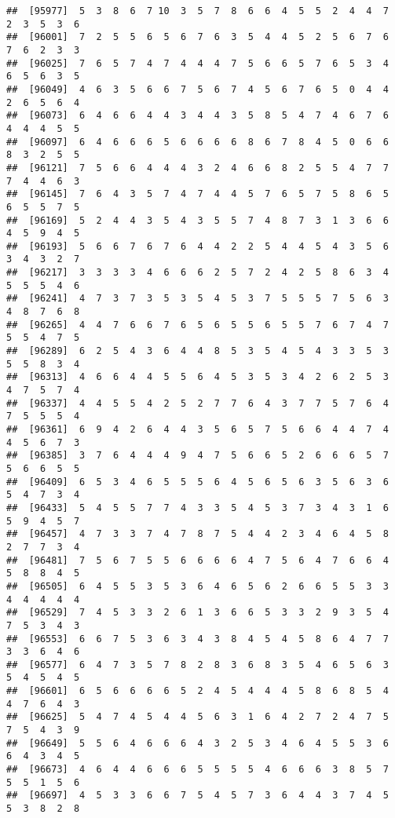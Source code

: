 \documentclass[
]{book}
\begin{document}
\begin{verbatim}
##  [95977]  5  3  8  6  7 10  3  5  7  8  6  6  4  5  5  2  4  4  7  2  3  5  3  6
##  [96001]  7  2  5  5  6  5  6  7  6  3  5  4  4  5  2  5  6  7  6  7  6  2  3  3
##  [96025]  7  6  5  7  4  7  4  4  4  7  5  6  6  5  7  6  5  3  4  6  5  6  3  5
##  [96049]  4  6  3  5  6  6  7  5  6  7  4  5  6  7  6  5  0  4  4  2  6  5  6  4
##  [96073]  6  4  6  6  4  4  3  4  4  3  5  8  5  4  7  4  6  7  6  4  4  4  5  5
##  [96097]  6  4  6  6  6  5  6  6  6  6  8  6  7  8  4  5  0  6  6  8  3  2  5  5
##  [96121]  7  5  6  6  4  4  4  3  2  4  6  6  8  2  5  5  4  7  7  7  4  4  6  3
##  [96145]  7  6  4  3  5  7  4  7  4  4  5  7  6  5  7  5  8  6  5  6  5  5  7  5
##  [96169]  5  2  4  4  3  5  4  3  5  5  7  4  8  7  3  1  3  6  6  4  5  9  4  5
##  [96193]  5  6  6  7  6  7  6  4  4  2  2  5  4  4  5  4  3  5  6  3  4  3  2  7
##  [96217]  3  3  3  3  4  6  6  6  2  5  7  2  4  2  5  8  6  3  4  5  5  5  4  6
##  [96241]  4  7  3  7  3  5  3  5  4  5  3  7  5  5  5  7  5  6  3  4  8  7  6  8
##  [96265]  4  4  7  6  6  7  6  5  6  5  5  6  5  5  7  6  7  4  7  5  5  4  7  5
##  [96289]  6  2  5  4  3  6  4  4  8  5  3  5  4  5  4  3  3  5  3  5  5  8  3  4
##  [96313]  4  6  6  4  4  5  5  6  4  5  3  5  3  4  2  6  2  5  3  4  7  5  7  4
##  [96337]  4  4  5  5  4  2  5  2  7  7  6  4  3  7  7  5  7  6  4  7  5  5  5  4
##  [96361]  6  9  4  2  6  4  4  3  5  6  5  7  5  6  6  4  4  7  4  4  5  6  7  3
##  [96385]  3  7  6  4  4  4  9  4  7  5  6  6  5  2  6  6  6  5  7  5  6  6  5  5
##  [96409]  6  5  3  4  6  5  5  5  6  4  5  6  5  6  3  5  6  3  6  5  4  7  3  4
##  [96433]  5  4  5  5  7  7  4  3  3  5  4  5  3  7  3  4  3  1  6  5  9  4  5  7
##  [96457]  4  7  3  3  7  4  7  8  7  5  4  4  2  3  4  6  4  5  8  2  7  7  3  4
##  [96481]  7  5  6  7  5  5  6  6  6  6  4  7  5  6  4  7  6  6  4  5  8  8  4  5
##  [96505]  6  4  5  5  3  5  3  6  4  6  5  6  2  6  6  5  5  3  3  4  4  4  4  4
##  [96529]  7  4  5  3  3  2  6  1  3  6  6  5  3  3  2  9  3  5  4  7  5  3  4  3
##  [96553]  6  6  7  5  3  6  3  4  3  8  4  5  4  5  8  6  4  7  7  3  3  6  4  6
##  [96577]  6  4  7  3  5  7  8  2  8  3  6  8  3  5  4  6  5  6  3  5  4  5  4  5
##  [96601]  6  5  6  6  6  6  5  2  4  5  4  4  4  5  8  6  8  5  4  4  7  6  4  3
##  [96625]  5  4  7  4  5  4  4  5  6  3  1  6  4  2  7  2  4  7  5  7  5  4  3  9
##  [96649]  5  5  6  4  6  6  6  4  3  2  5  3  4  6  4  5  5  3  6  6  4  3  4  5
##  [96673]  4  6  4  4  6  6  6  5  5  5  5  4  6  6  6  3  8  5  7  5  5  1  5  6
##  [96697]  4  5  3  3  6  6  7  5  4  5  7  3  6  4  4  3  7  4  5  5  3  8  2  8

\end{verbatim}
\end{document}
